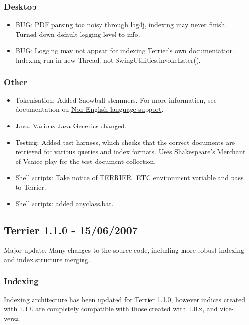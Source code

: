 \subsubsection{Desktop}\label{desktop-4}

\begin{itemize}
\tightlist
\item
  BUG: PDF parsing too noisy through log4j, indexing may never finish.
  Turned down default logging level to info.
\item
  BUG: Logging may not appear for indexing Terrier's own documentation.
  Indexing run in new Thread, not SwingUtilities.invokeLater().
\end{itemize}

\subsubsection{Other}\label{other-8}

\begin{itemize}
\tightlist
\item
  Tokenisation: Added Snowball stemmers. For more information, see
  documentation on \href{languages.html}{Non English language support}.
\item
  Java: Various Java Generics changed.
\item
  Testing: Added test harness, which checks that the correct documents
  are retrieved for various queries and index formats. Uses
  Shakespeare's Merchant of Venice play for the test document
  collection.
\item
  Shell scripts: Take notice of TERRIER\_ETC environment variable and
  pass to Terrier.
\item
  Shell scripts: added anyclass.bat.
\end{itemize}

\subsection{Terrier 1.1.0 - 15/06/2007}\label{terrier-1.1.0---15062007}

Major update. Many changes to the source code, including more robust
indexing and index structure merging.

\subsubsection{Indexing}\label{indexing-9}

Indexing architecture has been updated for Terrier 1.1.0, however
indices created with 1.1.0 are completely compatible with those created
with 1.0.x, and vice-versa.

